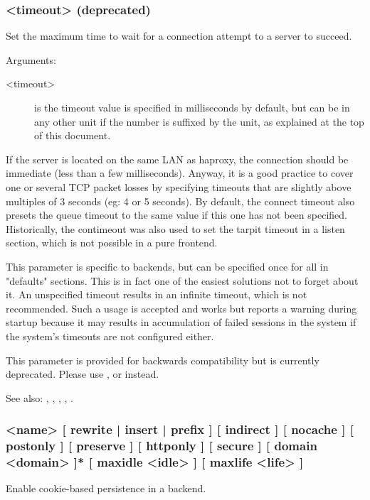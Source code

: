 \subsubsection[contimeout]{ <timeout> (deprecated)}

  Set the maximum time to wait for a connection attempt to a server to succeed.

  Arguments:
  \begin{description}
  \item[<timeout>] is the timeout value is specified in milliseconds by default, but
              can be in any other unit if the number is suffixed by the unit,
              as explained at the top of this document.  
  \end{description}

  If the server is located on the same LAN as haproxy, the connection should be
  immediate (less than a few milliseconds). Anyway, it is a good practice to
  cover one or several TCP packet losses by specifying timeouts that are
  slightly above multiples of 3 seconds (eg: 4 or 5 seconds). By default, the
  connect timeout also presets the queue timeout to the same value if this one
  has not been specified. Historically, the contimeout was also used to set the
  tarpit timeout in a listen section, which is not possible in a pure frontend.

  This parameter is specific to backends, but can be specified once for all in
  "defaults" sections. This is in fact one of the easiest solutions not to
  forget about it. An unspecified timeout results in an infinite timeout, which
  is not recommended. Such a usage is accepted and works but reports a warning
  during startup because it may results in accumulation of failed sessions in
  the system if the system's timeouts are not configured either.

  This parameter is provided for backwards compatibility but is currently
  deprecated. Please use ,  or 
  instead.

  See also: , , ,
             , .


\subsubsection[cookie]{ <name> [ rewrite | insert | prefix ] [ indirect ]  [ nocache ] [ postonly ] [ preserve ] [ httponly ] [ secure ] [ domain <domain> ]* [ maxidle <idle> ] [ maxlife <life> ]}
  Enable cookie-based persistence in a backend.
  
